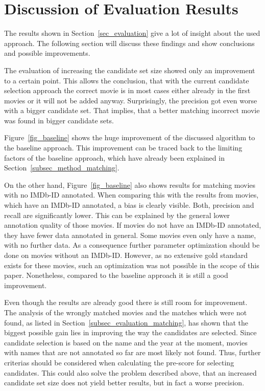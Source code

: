 \section{Discussion of Evaluation Results}
\label{sec_discussion}

The results shown in Section~\ref{sec_evaluation} give a lot of insight about the used approach.
The following section will discuss these findings and show conclusions and possible improvements.

The evaluation of increasing the candidate set size showed only an improvement to a certain point.
This allows the conclusion, that with the current candidate selection approach the correct movie is in most cases either already in the first movies or it will not be added anyway.
Surprisingly, the precision got even worse with a bigger candidate set.
That implies, that a better matching incorrect movie was found in bigger candidate sets.

Figure~\ref{fig_baseline} shows the huge improvement of the discussed algorithm to the baseline approach.
This improvement can be traced back to the limiting factors of the baseline approach, which have already been explained in Section~\ref{subsec_method_matching}.

On the other hand, Figure~\ref{fig_baseline} also shows results for matching movies with no IMDb-ID annotated.
When comparing this with the results from movies, which have an IMDb-ID annotated, a bias is clearly visible.
Both, precision and recall are significantly lower.
This can be explained by the general lower annotation quality of those movies.
If movies do not have an IMDb-ID annotated, they have fewer data annotated in general.
Some movies even only have a name, with no further data.
As a consequence further parameter optimization should be done on movies without an IMDb-ID.
However, as no extensive gold standard exists for these movies, such an optimization was not possible in the scope of this paper.
Nonetheless, compared to the baseline approach it is still a good improvement.

Even though the results are already good there is still room for improvement.
The analysis of the wrongly matched movies and the matches which were not found, as listed in Section~\ref{subsec_evaluation_matching}, has shown that the biggest possible gain lies in improving the way the candidates are selected.
Since candidate selection is based on the name and the year at the moment, movies with names that are not annotated so far are most likely not found.
Thus, further criterias should be considered when calculating the pre-score for selecting candidates.
This could also solve the problem described above, that an increased candidate set size does not yield better results, but in fact a worse precision.

